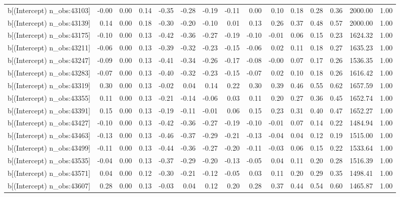 \begin{table}[ht]
\begin{tabular}{rrrrrrrrrrrrrrr}
  b[(Intercept) n\_obs:43103] & -0.00 & 0.00 & 0.14 & -0.35 & -0.28 & -0.19 & -0.11 & 0.00 & 0.10 & 0.18 & 0.28 & 0.36 & 2000.00 & 1.00 \\ 
  b[(Intercept) n\_obs:43139] & 0.14 & 0.00 & 0.18 & -0.30 & -0.20 & -0.10 & 0.01 & 0.13 & 0.26 & 0.37 & 0.48 & 0.57 & 2000.00 & 1.00 \\ 
  b[(Intercept) n\_obs:43175] & -0.10 & 0.00 & 0.13 & -0.42 & -0.36 & -0.27 & -0.19 & -0.10 & -0.01 & 0.06 & 0.15 & 0.23 & 1624.32 & 1.00 \\ 
  b[(Intercept) n\_obs:43211] & -0.06 & 0.00 & 0.13 & -0.39 & -0.32 & -0.23 & -0.15 & -0.06 & 0.02 & 0.11 & 0.18 & 0.27 & 1635.23 & 1.00 \\ 
  b[(Intercept) n\_obs:43247] & -0.09 & 0.00 & 0.13 & -0.41 & -0.34 & -0.26 & -0.17 & -0.08 & -0.00 & 0.07 & 0.17 & 0.26 & 1536.35 & 1.00 \\ 
  b[(Intercept) n\_obs:43283] & -0.07 & 0.00 & 0.13 & -0.40 & -0.32 & -0.23 & -0.15 & -0.07 & 0.02 & 0.10 & 0.18 & 0.26 & 1616.42 & 1.00 \\ 
  b[(Intercept) n\_obs:43319] & 0.30 & 0.00 & 0.13 & -0.02 & 0.04 & 0.14 & 0.22 & 0.30 & 0.39 & 0.46 & 0.55 & 0.62 & 1657.59 & 1.00 \\ 
  b[(Intercept) n\_obs:43355] & 0.11 & 0.00 & 0.13 & -0.21 & -0.14 & -0.06 & 0.03 & 0.11 & 0.20 & 0.27 & 0.36 & 0.45 & 1652.74 & 1.00 \\ 
  b[(Intercept) n\_obs:43391] & 0.15 & 0.00 & 0.13 & -0.19 & -0.11 & -0.01 & 0.06 & 0.15 & 0.23 & 0.31 & 0.40 & 0.47 & 1652.27 & 1.00 \\ 
  b[(Intercept) n\_obs:43427] & -0.10 & 0.00 & 0.13 & -0.42 & -0.36 & -0.27 & -0.19 & -0.10 & -0.01 & 0.07 & 0.14 & 0.22 & 1484.94 & 1.00 \\ 
  b[(Intercept) n\_obs:43463] & -0.13 & 0.00 & 0.13 & -0.46 & -0.37 & -0.29 & -0.21 & -0.13 & -0.04 & 0.04 & 0.12 & 0.19 & 1515.00 & 1.00 \\ 
  b[(Intercept) n\_obs:43499] & -0.11 & 0.00 & 0.13 & -0.44 & -0.36 & -0.27 & -0.20 & -0.11 & -0.03 & 0.06 & 0.15 & 0.22 & 1533.64 & 1.00 \\ 
  b[(Intercept) n\_obs:43535] & -0.04 & 0.00 & 0.13 & -0.37 & -0.29 & -0.20 & -0.13 & -0.05 & 0.04 & 0.11 & 0.20 & 0.28 & 1516.39 & 1.00 \\ 
  b[(Intercept) n\_obs:43571] & 0.04 & 0.00 & 0.12 & -0.30 & -0.21 & -0.12 & -0.05 & 0.03 & 0.11 & 0.20 & 0.29 & 0.35 & 1498.41 & 1.00 \\ 
  b[(Intercept) n\_obs:43607] & 0.28 & 0.00 & 0.13 & -0.03 & 0.04 & 0.12 & 0.20 & 0.28 & 0.37 & 0.44 & 0.54 & 0.60 & 1465.87 & 1.00 \\ 

\end{tabular}
\end{table}
